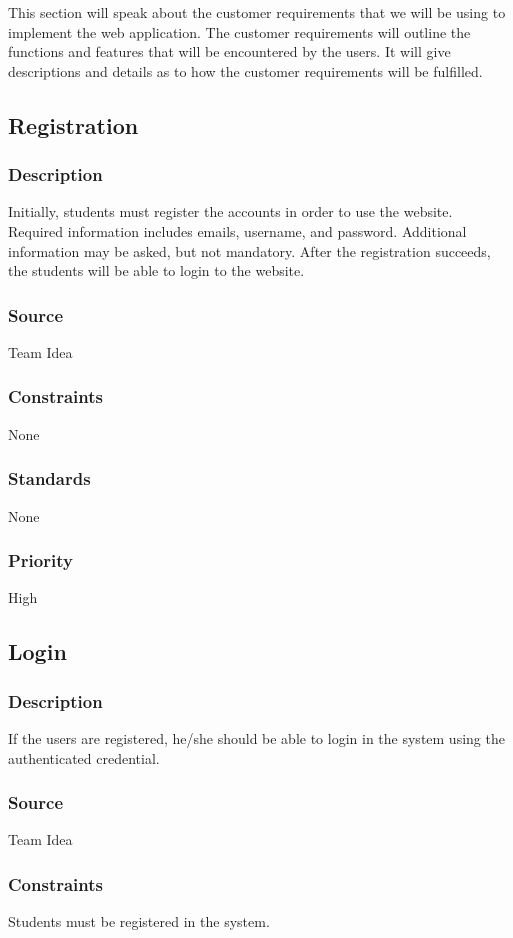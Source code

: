 This section will speak about the customer requirements that we will be using to implement the web application. The customer requirements will outline the functions and features that will be encountered by the users. It will give descriptions and details as to how the customer requirements will be fulfilled. 

\subsection{Registration}
\subsubsection{Description}
Initially, students must register the accounts in order to use the website. Required information includes emails, username, and password. Additional information may be asked, but not mandatory. After the registration succeeds, the students will be able to login to the website.
\subsubsection{Source}
Team Idea
\subsubsection{Constraints}
None
\subsubsection{Standards}
None
\subsubsection{Priority}
High

\subsection{Login}
\subsubsection{Description}
If the users are registered, he/she should be able to login in the system using the authenticated credential.
\subsubsection{Source}
Team Idea
\subsubsection{Constraints}
Students must be registered in the system.
